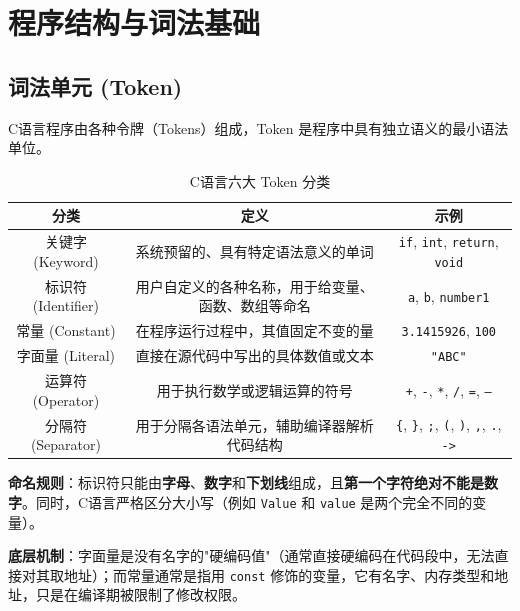 \clearpage
\begingroup
\let\clearpage\relax
\let\cleardoublepage\relax
\vspace*{\fill}
\chapter{程序结构与词法基础}
\vspace*{\fill}
\endgroup
\clearpage


\section{词法单元 (Token)}

C语言程序由各种令牌（Tokens）组成，Token 是程序中具有独立语义的最小语法单位。

\begin{table}[H]
\centering
\small
\renewcommand{\arraystretch}{1.5}
\begin{tabulary}{\linewidth}{@{}CCC@{}}
\toprule
\textbf{分类} & \textbf{定义} & \textbf{示例} \\
\midrule
关键字 (Keyword) & 系统预留的、具有特定语法意义的单词 & \texttt{if}, \texttt{int}, \texttt{return}, \texttt{void} \\
标识符 (Identifier) & 用户自定义的各种名称，用于给变量、函数、数组等命名 & \texttt{a}, \texttt{b}, \texttt{number1} \\
常量 (Constant) & 在程序运行过程中，其值固定不变的量 & \texttt{3.1415926}, \texttt{100} \\
字面量 (Literal) & 直接在源代码中写出的具体数值或文本 & \texttt{"ABC"} \\
运算符 (Operator) & 用于执行数学或逻辑运算的符号 & \texttt{+}, \texttt{-}, \texttt{*}, \texttt{/}, \texttt{=}, \texttt{--} \\
分隔符 (Separator) & 用于分隔各语法单元，辅助编译器解析代码结构 & \texttt{\{}, \texttt{\}}, \texttt{;}, \texttt{(}, \texttt{)}, \texttt{,}, \texttt{.}, \texttt{->} \\
\bottomrule
\end{tabulary}
\caption{C语言六大 Token 分类}
\label{tab:token_types}
\end{table}

\vspace{0.5em}
\noindent\textbf{命名规则}：标识符只能由\textbf{字母}、\textbf{数字}和\textbf{下划线}组成，且\textbf{第一个字符绝对不能是数字}。同时，C语言严格区分大小写（例如 \texttt{Value} 和 \texttt{value} 是两个完全不同的变量）。

\vspace{0.5em}
\noindent\textbf{底层机制}：字面量是没有名字的"硬编码值"（通常直接硬编码在代码段中，无法直接对其取地址）；而常量通常是指用 \texttt{const} 修饰的变量，它有名字、内存类型和地址，只是在编译期被限制了修改权限。

